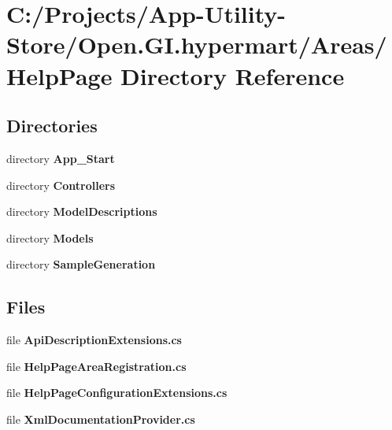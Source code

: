 \section{C\+:/\+Projects/\+App-\/\+Utility-\/\+Store/\+Open.G\+I.\+hypermart/\+Areas/\+Help\+Page Directory Reference}
\label{dir_ce336a7fb76c4d2446b79ec0ec42a01a}
\subsection*{Directories}
\begin{DoxyCompactItemize}
\item 
directory \textbf{ App\+\_\+\+Start}
\item 
directory \textbf{ Controllers}
\item 
directory \textbf{ Model\+Descriptions}
\item 
directory \textbf{ Models}
\item 
directory \textbf{ Sample\+Generation}
\end{DoxyCompactItemize}
\subsection*{Files}
\begin{DoxyCompactItemize}
\item 
file \textbf{ Api\+Description\+Extensions.\+cs}
\item 
file \textbf{ Help\+Page\+Area\+Registration.\+cs}
\item 
file \textbf{ Help\+Page\+Configuration\+Extensions.\+cs}
\item 
file \textbf{ Xml\+Documentation\+Provider.\+cs}
\end{DoxyCompactItemize}
